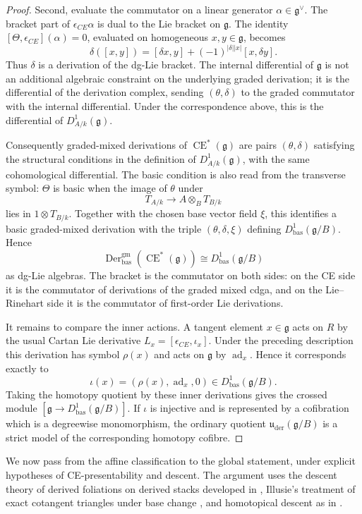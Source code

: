 \documentclass[11pt,reqno,a4paper,dvipsnames,x11names]{amsart}
\numberwithin{equation}{section}
\theoremstyle{plain}
\theoremstyle{definition}
\theoremstyle{remark}
\DeclareMathOperator{\Der}{Der}
\DeclareMathOperator{\CE}{CE}
\newcommand{\kk}{k}
\newcommand{\g}{\mathfrak g}
\newcommand{\uuder}{\mathfrak u_{\mathrm{der}}}
\newcommand{\gm}{\mathrm{gm}}
\newcommand{\bas}{\mathrm{bas}}
\begin{document}
\begin{proof}
Second, evaluate the commutator on a linear generator \(\alpha\in\g^\vee\). The bracket part of \(\epsilon_{CE}\alpha\) is dual to the Lie bracket on \(\g\). The identity \([\Theta,\epsilon_{CE}](\alpha)=0\), evaluated on homogeneous \(x,y\in\g\), becomes
\[
 \delta([x,y])=[\delta x,y]+(-1)^{|\delta||x|}[x,\delta y].
\]
Thus \(\delta\) is a derivation of the dg-Lie bracket. The internal differential of \(\g\) is not an additional algebraic constraint on the underlying graded derivation; it is the differential of the derivation complex, sending \((\theta,\delta)\) to the graded commutator with the internal differential. Under the correspondence above, this is the differential of \(D^1_{A/\kk}(\g)\).

Consequently graded-mixed derivations of \(\CE^*(\g)\) are pairs \((\theta,\delta)\) satisfying the structural conditions in the definition of \(D^1_{A/\kk}(\g)\), with the same cohomological differential. The basic condition is also read from the transverse symbol: \(\Theta\) is basic when the image of \(\theta\) under
\[
 T_{A/\kk}\longrightarrow A\otimes_B T_{B/\kk}
\]
lies in \(1\otimes T_{B/\kk}\). Together with the chosen base vector field \(\xi\), this identifies a basic graded-mixed derivation with the triple \((\theta,\delta,\xi)\) defining \(D^1_{\bas}(\g/B)\). Hence
\[
 \Der^{\gm}_{\bas}(\CE^*(\g))\cong D^1_{\bas}(\g/B)
\]
as dg-Lie algebras. The bracket is the commutator on both sides: on the CE side it is the commutator of derivations of the graded mixed cdga, and on the Lie--Rinehart side it is the commutator of first-order Lie derivations.

It remains to compare the inner actions. A tangent element \(x\in\g\) acts on \(R\) by the usual Cartan Lie derivative \(L_x=[\epsilon_{CE},\iota_x]\). Under the preceding description this derivation has symbol \(\rho(x)\) and acts on \(\g\) by \(\operatorname{ad}_x\). Hence it corresponds exactly to
\[
 \iota(x)=(\rho(x),\operatorname{ad}_x,0)\in D^1_{\bas}(\g/B).
\]
Taking the homotopy quotient by these inner derivations gives the crossed module \([\g\to D^1_{\bas}(\g/B)]\). If \(\iota\) is injective and is represented by a cofibration which is a degreewise monomorphism, the ordinary quotient \(\uuder(\g/B)\) is a strict model of the corresponding homotopy cofibre.
\end{proof}

We now pass from the affine classification to the global statement, under explicit hypotheses of CE-presentability and descent. The argument uses the descent theory of derived foliations on derived stacks developed in \cite[Section~2.1]{TV}, Illusie's treatment of exact cotangent triangles under base change \cite{IllusieI}, and homotopical descent as in \cite{HAGII}.
\end{document}

